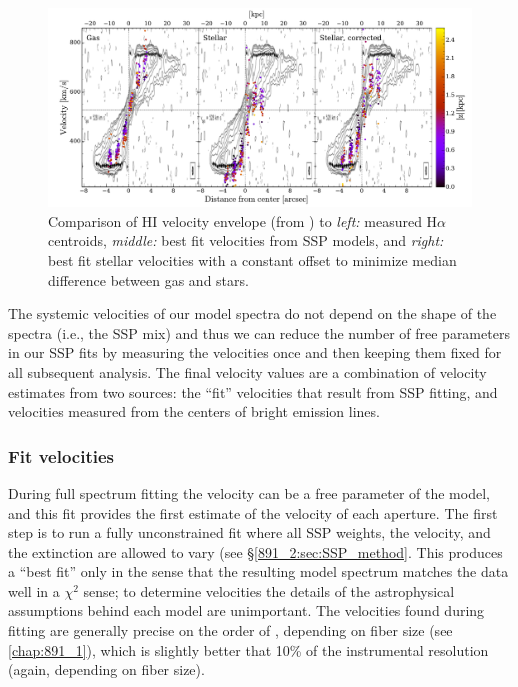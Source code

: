 \begin{figure}[t]
  \centering
  \includegraphics[width=\textwidth]{891_2/figs/Swat_vel.pdf}
  \caption[Comparison of measure stellar and gas velocities to HI
    velocity data]{\fixspacing\label{891_2:fig:Swat_vel}Comparison of
    HI velocity envelope (from \citet{Swaters97}) to \emph{left:}
    measured H$\alpha$ centroids, \emph{middle:} best fit velocities
    from SSP models, and \emph{right:} best fit stellar velocities
    with a constant offset to minimize median difference between gas
    and stars.}
\end{figure}
The systemic velocities of our model spectra do not depend on the
shape of the spectra (i.e., the SSP mix) and thus we can reduce the
number of free parameters in our SSP fits by measuring the velocities
once and then keeping them fixed for all subsequent analysis. The
final velocity values are a combination of velocity estimates from two
sources: the ``fit'' velocities that result from SSP fitting, and
velocities measured from the centers of bright emission lines.


\subsubsection{Fit velocities}
During full spectrum fitting the velocity can be a free parameter of
the model, and this fit provides the first estimate of the velocity of
each aperture. The first step is to run a fully unconstrained fit
where all SSP weights, the velocity, and the extinction are allowed to
vary (see \S\ref{891_2:sec:SSP_method}. This produces a ``best fit'' only in
the sense that the resulting model spectrum matches the data well in a
$\chi^2$ sense; to determine velocities the details of the
astrophysical assumptions behind each model are unimportant. The
velocities found during fitting are generally precise on the order of
, depending on \GP fiber size (see
\ref{chap:891_1}), which is slightly better that 10\% of the
instrumental resolution (again, depending on fiber size).

